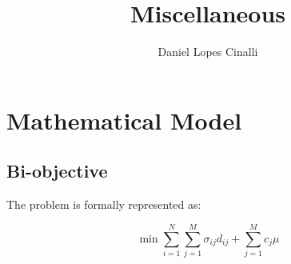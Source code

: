 \documentclass{llncs}
\begin{document}
\mainmatter  %

\title{Miscellaneous}


%
\author{Daniel Lopes Cinalli%
}
%


%
%

\maketitle

\tableofcontents

\newpage
\section{Mathematical Model}

\subsection{Bi-objective}\label{sec:biobjective}
The problem is formally represented as: 



\begin{equation}
\min \sum\limits_{i=1}^{N} \sum\limits_{j=1}^{M} \sigma_{ij}d_{ij} + \sum\limits_{j=1}^{M}c_j\mu
\end{equation}
\end{document}
